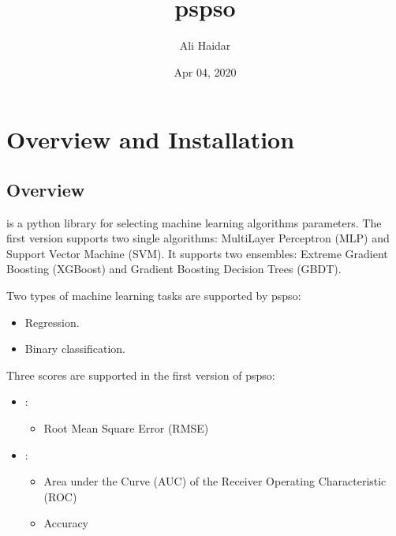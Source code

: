 \documentclass[letterpaper,10pt,english]{sphinxmanual}
\title{pspso}
\date{Apr 04, 2020}
\author{Ali Haidar}
\begin{document}
\pagestyle{empty}
\sphinxmaketitle
\pagestyle{plain}
\sphinxtableofcontents
\pagestyle{normal}
\label{\detokenize{index::doc}}




\chapter{Overview and Installation}
\label{\detokenize{index:overview-and-installation}}

\section{Overview}
\label{\detokenize{index:overview}}
 is a python library for selecting machine learning algorithms
parameters. The first version supports two single algorithms:
Multi\sphinxhyphen{}Layer Perceptron (MLP) and Support Vector Machine (SVM). It
supports two ensembles: Extreme Gradient Boosting (XGBoost) and Gradient
Boosting Decision Trees (GBDT).

Two types of machine learning tasks are supported by pspso:
\begin{itemize}
\item {} 
Regression.

\item {} 
Binary classification.

\end{itemize}

Three scores are supported in the first version of pspso:
\begin{itemize}
\item {} 
 :
\begin{itemize}
\item {} 
Root Mean Square Error (RMSE)

\end{itemize}

\item {} 
 :
\begin{itemize}
\item {} 
Area under the Curve (AUC) of the Receiver Operating Characteristic (ROC)

\item {} 
Accuracy

\end{itemize}

\end{itemize}
\end{document}
